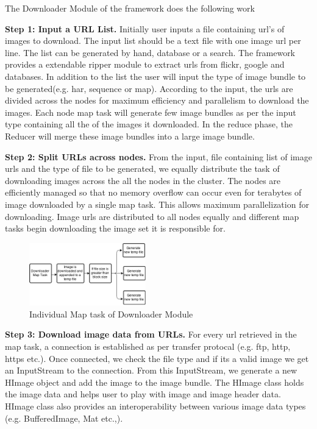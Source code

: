 \documentclass[conference]{IEEEtran}
\begin{document}
The Downloader Module of the framework does the following work

\textbf{Step 1: Input a URL List.} Initially user inputs a file containing url's of images to download. The input list should be a text file with one image url per line. The list can be generated by hand, database or a search. The framework provides a extendable ripper module to extract urls from flickr, google and databases. In addition to the list the user will input the type of image bundle to be generated(e.g. har, sequence or map). According to the input, the urls are divided across the nodes for maximum efficiency and parallelism to download the images. Each node map task will generate few image bundles as per the input type containing all the of the images it downloaded. In the reduce phase, the Reducer will merge these image bundles  into a large image bundle.

\textbf{Step 2: Split URLs across nodes.}
From the input, file containing list of image urls and the type of file to be generated, we equally distribute the task of downloading images across the all the nodes in the cluster. The nodes are efficiently managed so that no memory overflow can occur even for terabytes of image downloaded by a single map task. This allows maximum parallelization for downloading. Image urls are distributed to all nodes equally and different map tasks begin downloading the image set it is responsible for.

\begin{figure}[h]
	\centering
	\includegraphics[width=0.45\textwidth]{down-map}
	\caption{Individual Map task of Downloader Module}
	\label{fig:down-map}
\end{figure}

\textbf{Step 3: Download image data from URLs.}
For every url retrieved in the map task, a connection is established as per transfer protocal (e.g. ftp, http, https etc.). Once connected, we check the file type and if its a valid image we get an InputStream to the connection. From this InputStream, we generate a new HImage object and add the image to the image bundle. The HImage class holds the image data and helps user to play with image and image header data. HImage class also provides an interoperability between various image data types (e.g. BufferedImage, Mat etc.,).
\end{document}
